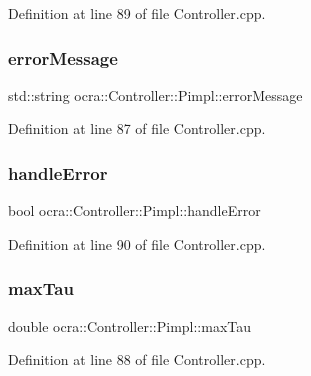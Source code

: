 Definition at line 89 of file Controller.\+cpp.

\hypertarget{structocra_1_1Controller_1_1Pimpl_a1150a44bd413ec025703d53c8eaf4733}{}\label{structocra_1_1Controller_1_1Pimpl_a1150a44bd413ec025703d53c8eaf4733} 
\subsubsection{\texorpdfstring{error\+Message}{errorMessage}}
{\footnotesize\ttfamily std\+::string ocra\+::\+Controller\+::\+Pimpl\+::error\+Message}



Definition at line 87 of file Controller.\+cpp.

\hypertarget{structocra_1_1Controller_1_1Pimpl_a2764f0bf903a983abae8195ab6639ed5}{}\label{structocra_1_1Controller_1_1Pimpl_a2764f0bf903a983abae8195ab6639ed5} 
\subsubsection{\texorpdfstring{handle\+Error}{handleError}}
{\footnotesize\ttfamily bool ocra\+::\+Controller\+::\+Pimpl\+::handle\+Error}



Definition at line 90 of file Controller.\+cpp.

\hypertarget{structocra_1_1Controller_1_1Pimpl_a6731e905858ef90305a3c99c605c8069}{}\label{structocra_1_1Controller_1_1Pimpl_a6731e905858ef90305a3c99c605c8069} 
\subsubsection{\texorpdfstring{max\+Tau}{maxTau}}
{\footnotesize\ttfamily double ocra\+::\+Controller\+::\+Pimpl\+::max\+Tau}



Definition at line 88 of file Controller.\+cpp.

\hypertarget{structocra_1_1Controller_1_1Pimpl_aadf5eccdc9453d1f277f62b7becf7390}{}\label{structocra_1_1Controller_1_1Pimpl_aadf5eccdc9453d1f277f62b7becf7390} 
